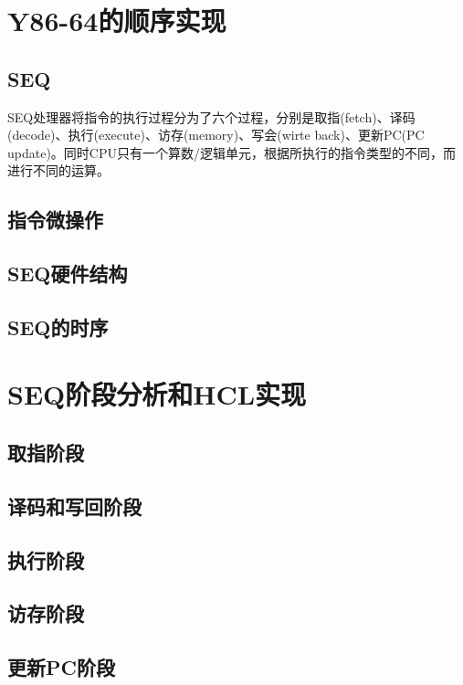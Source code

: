 \documentclass[a4paper,12pt]{report}
\begin{document}
\chapter{Y86-64的顺序实现}
\begin{spacing}{1.5}
\section{SEQ}
	SEQ处理器将指令的执行过程分为了六个过程，分别是取指(fetch)、译码(decode)、执行(execute)、访存(memory)、写会(wirte back)、更新PC(PC update)。同时CPU只有一个算数/逻辑单元，根据所执行的指令类型的不同，而进行不同的运算。
	
\section{指令微操作}
	

\section{SEQ硬件结构}


\section{SEQ的时序}

\end{spacing}


\chapter{SEQ阶段分析和HCL实现}
\begin{spacing}{1.5}
	
\section{取指阶段}	

	
\section{译码和写回阶段}


\section{执行阶段}


\section{访存阶段}
	

\section{更新PC阶段}
	
\end{spacing}
\end{document}
